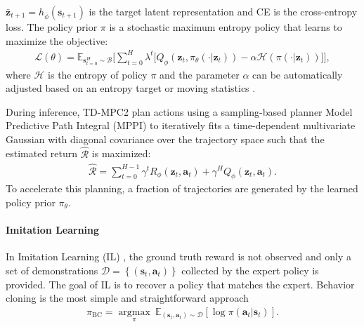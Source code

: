 $\bar{\mathbf{z}}_{t+1} = h_{\bar{\phi}}\left(\mathbf{s}_{t+1}\right)$ is the target latent representation and CE is the cross-entropy loss. The policy prior $\pi$ is a stochastic maximum entropy policy that learns to maximize the objective: 
\begin{align}
    \nonumber \mathcal{L}\left(\theta\right) = \mathbb{E}_{\mathbf{s}_{t=0}^{H} \sim \mathcal{B}} \Bigg[\sum_{t=0}^{H}\lambda^t\Big[Q_{\phi}\left(\mathbf{z}_t, \pi_{\theta}\left(\cdot|\mathbf{z}_t\right)\right) - \alpha \mathcal{H}\left(\pi\left(\cdot|\mathbf{z}_t\right)\right)\Big]\Bigg],
\end{align}
where $\mathcal{H}$ is the entropy of policy $\pi$ and the parameter $\alpha$ can be automatically adjusted based on an entropy target \citep{haarnoja2018soft} or moving statistics \citep{hafner2023mastering}.

During inference, TD-MPC2 plan actions using a sampling-based planner Model Predictive Path Integral (MPPI) \citep{williams2015model} to iteratively fits a time-dependent multivariate Gaussian with diagonal covariance over the trajectory space such that the estimated return $\hat{\mathcal{R}}$ is maximized:
\begin{align}
    \hat{\mathcal{R}} = \sum_{t=0}^{H-1}\gamma^t R_{\phi}\left(\mathbf{z}_t, \mathbf{a}_t\right) + \gamma^H Q_{\phi}\left(\mathbf{z}_t, \mathbf{a}_t\right).
\end{align}
To accelerate this planning, a fraction of trajectories are generated by the learned policy prior $\pi_{\theta}$.

\paragraph{Imitation Learning} In Imitation Learning (IL) \citep{zare2024survey}, the ground truth reward is not observed and only a set of demonstrations $\mathcal{D}=\left\{\left(\mathbf{s}_t,\mathbf{a}_t\right)\right\}$ collected by the expert policy is provided. The goal of IL is to recover a policy that matches the expert. Behavior cloning \citep{pomerleau1988alvinn} is the most simple and straightforward approach
\begin{align}
    \nonumber\pi_{\text{BC}} = \underset{\pi}{\operatorname{argmax}} \ \mathbb{E}_{\left(\mathbf{s}_t,\mathbf{a}_t\right) \sim \mathcal{D}}\left[\operatorname{log}\pi\left(\mathbf{a}_t|\mathbf{s}_t\right)\right].
\end{align}
